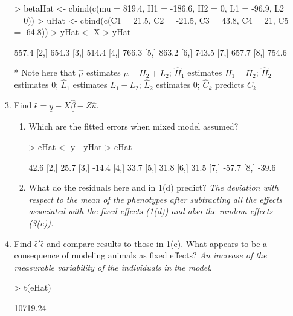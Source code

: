 \documentclass[12pt,a4paper]{paper}
\begin{document}
\begin{enumerate}
\begin{enumerate}
\begin{Schunk}
\begin{Sinput}
> betaHat <- cbind(c(mu = 819.4, H1 = -186.6, H2 = 0, L1 = -96.9, L2 = 0))
> uHat <- cbind(c(C1 = 21.5, C2 = -21.5, C3 = 43.8, C4 = 21,  C5 = -64.8))
> yHat <- X %*% betaHat + Z %*% uHat
> yHat
\end{Sinput}
\begin{Soutput}
      [,1]
[1,] 557.4
[2,] 654.3
[3,] 514.4
[4,] 766.3
[5,] 863.2
[6,] 743.5
[7,] 657.7
[8,] 754.6
\end{Soutput}
\end{Schunk}
\item[*] Note here that $\hat{\mu}$ estimates $\mu + H_{2} + L_{2}$; $\hat{H}_{1}$ estimates $H_{1} - H_{2}$; $\hat{H}_{2}$ estimates $0$; $\hat{L}_{1}$ estimates $L_{1} - L_{2}$; $\hat{L}_{2}$ estimates $0$; $\hat{C}_{k}$ predicts $C_{k}$
\item Find $\underline{\hat{\epsilon}} = \underline{y} - X\underline{\hat{\beta}} - Z\underline{\hat{u}}$.
\begin{enumerate}
\item Which are the fitted errors when mixed model assumed? 
\begin{Schunk}
\begin{Sinput}
> eHat <- y - yHat
> eHat
\end{Sinput}
\begin{Soutput}
      [,1]
[1,]  42.6
[2,]  25.7
[3,] -14.4
[4,]  33.7
[5,]  31.8
[6,]  31.5
[7,] -57.7
[8,] -39.6
\end{Soutput}
\end{Schunk}
\item What do the residuals here and in 1(d) predict? \textit{The deviation with respect to the mean of the phenotypes after subtracting all the effects associated with the fixed effects (1(d)) and also the random effects (3(c)).}
\end{enumerate}
\item Find $\underline{\hat{\epsilon}}'\underline{\hat{\epsilon}}$ and compare results to those in 1(e). What appears to be a consequence of modeling animals as fixed effects? \textit{An increase of the measurable variability of the individuals in the model}.
\begin{Schunk}
\begin{Sinput}
> t(eHat) %*% eHat
\end{Sinput}
\begin{Soutput}
         [,1]
[1,] 10719.24
\end{Soutput}
\end{Schunk}
\end{enumerate}
\end{enumerate}
\end{document}
